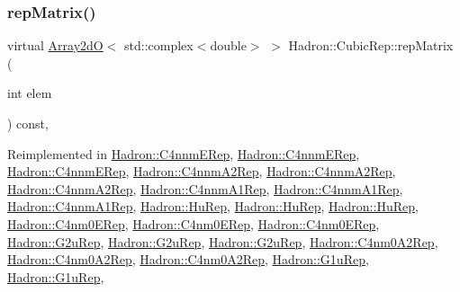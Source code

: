 \subsubsection{\texorpdfstring{repMatrix()}{repMatrix()}\hspace{0.1cm}{\footnotesize\ttfamily [1/3]}}
{\footnotesize\ttfamily virtual \mbox{\hyperlink{classADAT_1_1Array2dO}{Array2dO}}$<$ std\+::complex$<$double$>$ $>$ Hadron\+::\+Cubic\+Rep\+::rep\+Matrix (\begin{DoxyParamCaption}\item[{int}]{elem }\end{DoxyParamCaption}) const\hspace{0.3cm}{\ttfamily [inline]}, {\ttfamily [virtual]}}



Reimplemented in \mbox{\hyperlink{structHadron_1_1C4nnmERep_adb5804895fb825dd5a5fde9c417e5cb8}{Hadron\+::\+C4nnm\+E\+Rep}}, \mbox{\hyperlink{structHadron_1_1C4nnmERep_adb5804895fb825dd5a5fde9c417e5cb8}{Hadron\+::\+C4nnm\+E\+Rep}}, \mbox{\hyperlink{structHadron_1_1C4nnmERep_adb5804895fb825dd5a5fde9c417e5cb8}{Hadron\+::\+C4nnm\+E\+Rep}}, \mbox{\hyperlink{structHadron_1_1C4nnmA2Rep_a7c58333a62449bb9badf449950b1828b}{Hadron\+::\+C4nnm\+A2\+Rep}}, \mbox{\hyperlink{structHadron_1_1C4nnmA2Rep_a7c58333a62449bb9badf449950b1828b}{Hadron\+::\+C4nnm\+A2\+Rep}}, \mbox{\hyperlink{structHadron_1_1C4nnmA2Rep_a7c58333a62449bb9badf449950b1828b}{Hadron\+::\+C4nnm\+A2\+Rep}}, \mbox{\hyperlink{structHadron_1_1C4nnmA1Rep_afd420b29cea68de99ec5e175a42bafc7}{Hadron\+::\+C4nnm\+A1\+Rep}}, \mbox{\hyperlink{structHadron_1_1C4nnmA1Rep_afd420b29cea68de99ec5e175a42bafc7}{Hadron\+::\+C4nnm\+A1\+Rep}}, \mbox{\hyperlink{structHadron_1_1C4nnmA1Rep_afd420b29cea68de99ec5e175a42bafc7}{Hadron\+::\+C4nnm\+A1\+Rep}}, \mbox{\hyperlink{structHadron_1_1HuRep_a744a3604c724067d8912075d0d8acf59}{Hadron\+::\+Hu\+Rep}}, \mbox{\hyperlink{structHadron_1_1HuRep_a744a3604c724067d8912075d0d8acf59}{Hadron\+::\+Hu\+Rep}}, \mbox{\hyperlink{structHadron_1_1HuRep_a744a3604c724067d8912075d0d8acf59}{Hadron\+::\+Hu\+Rep}}, \mbox{\hyperlink{structHadron_1_1C4nm0ERep_aa9353c0f2a226224911c51db6f647ccf}{Hadron\+::\+C4nm0\+E\+Rep}}, \mbox{\hyperlink{structHadron_1_1C4nm0ERep_aa9353c0f2a226224911c51db6f647ccf}{Hadron\+::\+C4nm0\+E\+Rep}}, \mbox{\hyperlink{structHadron_1_1C4nm0ERep_aa9353c0f2a226224911c51db6f647ccf}{Hadron\+::\+C4nm0\+E\+Rep}}, \mbox{\hyperlink{structHadron_1_1G2uRep_ac35dd43af2c4b6f32d9d3511b2500230}{Hadron\+::\+G2u\+Rep}}, \mbox{\hyperlink{structHadron_1_1G2uRep_ac35dd43af2c4b6f32d9d3511b2500230}{Hadron\+::\+G2u\+Rep}}, \mbox{\hyperlink{structHadron_1_1G2uRep_ac35dd43af2c4b6f32d9d3511b2500230}{Hadron\+::\+G2u\+Rep}}, \mbox{\hyperlink{structHadron_1_1C4nm0A2Rep_aac52fe57a274d94bbaef9c6b2699e1c9}{Hadron\+::\+C4nm0\+A2\+Rep}}, \mbox{\hyperlink{structHadron_1_1C4nm0A2Rep_aac52fe57a274d94bbaef9c6b2699e1c9}{Hadron\+::\+C4nm0\+A2\+Rep}}, \mbox{\hyperlink{structHadron_1_1C4nm0A2Rep_aac52fe57a274d94bbaef9c6b2699e1c9}{Hadron\+::\+C4nm0\+A2\+Rep}}, \mbox{\hyperlink{structHadron_1_1G1uRep_a0f295ec0cd03014d647fa952f2c67676}{Hadron\+::\+G1u\+Rep}}, \mbox{\hyperlink{structHadron_1_1G1uRep_a0f295ec0cd03014d647fa952f2c67676}{Hadron\+::\+G1u\+Rep}}, 